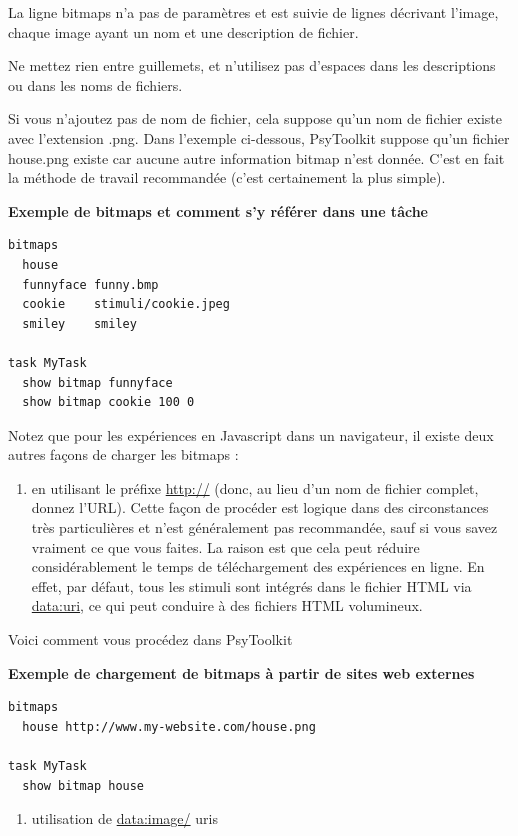 \documentclass[
]{book}
\providecommand{\tightlist}{%
  \setlength{\itemsep}{0pt}\setlength{\parskip}{0pt}}
\begin{document}
La ligne bitmaps n'a pas de paramètres et est suivie de lignes décrivant
l'image, chaque image ayant un nom et une description de fichier.

Ne mettez rien entre guillemets, et n'utilisez pas d'espaces dans les
descriptions ou dans les noms de fichiers.

Si vous n'ajoutez pas de nom de fichier, cela suppose qu'un nom de
fichier existe avec l'extension .png. Dans l'exemple ci-dessous,
PsyToolkit suppose qu'un fichier house.png existe car aucune autre
information bitmap n'est donnée. C'est en fait la méthode de travail
recommandée (c'est certainement la plus simple).

\textbf{Exemple de bitmaps et comment s'y référer dans une tâche}

\begin{verbatim}
bitmaps
  house
  funnyface funny.bmp
  cookie    stimuli/cookie.jpeg
  smiley    smiley

task MyTask
  show bitmap funnyface
  show bitmap cookie 100 0
\end{verbatim}

Notez que pour les expériences en Javascript dans un navigateur, il
existe deux autres façons de charger les bitmaps :

\begin{enumerate}
\def\labelenumi{\arabic{enumi}.}
\tightlist
\item
  en utilisant le préfixe \url{http://} (donc, au lieu d'un nom de
  fichier complet, donnez l'URL). Cette façon de procéder est logique
  dans des circonstances très particulières et n'est généralement pas
  recommandée, sauf si vous savez vraiment ce que vous faites. La raison
  est que cela peut réduire considérablement le temps de téléchargement
  des expériences en ligne. En effet, par défaut, tous les stimuli sont
  intégrés dans le fichier HTML via \url{data:uri}, ce qui peut conduire
  à des fichiers HTML volumineux.
\end{enumerate}

Voici comment vous procédez dans PsyToolkit

\textbf{Exemple de chargement de bitmaps à partir de sites web externes}

\begin{verbatim}
bitmaps
  house http://www.my-website.com/house.png

task MyTask
  show bitmap house
\end{verbatim}

\begin{enumerate}
\def\labelenumi{\arabic{enumi}.}
\setcounter{enumi}{1}
\tightlist
\item
  utilisation de \url{data:image/} uris
\end{enumerate}
\end{document}
